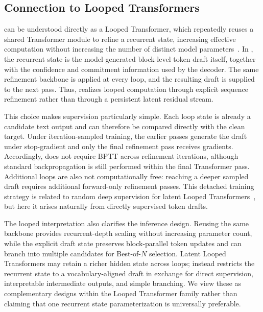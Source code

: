 \subsection{Connection to Looped Transformers}
\label{sec:looped_connection}

\method can be understood directly as a Looped Transformer, which repeatedly reuses a shared Transformer module to refine a recurrent state, increasing effective computation without increasing the number of distinct model parameters~\citep{dehghani2019universal,saunshi2025latentthoughts,geiping2025recurrentdepth}.
In \method, the recurrent state is the model-generated block-level token draft itself, together with the confidence and commitment information used by the decoder.
The same refinement backbone is applied at every loop, and the resulting draft is supplied to the next pass.
Thus, \method realizes looped computation through explicit sequence refinement rather than through a persistent latent residual stream.

This choice makes supervision particularly simple.
Each loop state is already a candidate text output and can therefore be compared directly with the clean target.
Under iteration-sampled training, the earlier passes generate the draft under stop-gradient and only the final refinement pass receives gradients.
Accordingly, \method does not require BPTT across refinement iterations, although standard backpropagation is still performed within the final Transformer pass.
Additional loops are also not computationally free: reaching a deeper sampled draft requires additional forward-only refinement passes.
This detached training strategy is related to random deep supervision for latent Looped Transformers~\citep{park2026loopus}, but here it arises naturally from directly supervised token drafts.

The looped interpretation also clarifies the inference design.
Reusing the same backbone provides recurrent-depth scaling without increasing parameter count, while the explicit draft state preserves block-parallel token updates and can branch into multiple candidates for Best-of-$N$ selection.
Latent Looped Transformers may retain a richer hidden state across loops; \method instead restricts the recurrent state to a vocabulary-aligned draft in exchange for direct supervision, interpretable intermediate outputs, and simple branching.
We view these as complementary designs within the Looped Transformer family rather than claiming that one recurrent state parameterization is universally preferable.

